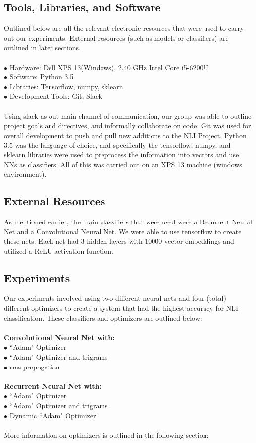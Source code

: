 \documentclass[12pt]{article}
\newcommand\tab[1][1cm]{\hspace*{#1}}
\begin{document}
 \subsection{Tools, Libraries, and Software}
 Outlined below are all the relevant electronic resources that were used to carry out our experiments. External resources (such as models or classifiers) are outlined in later sections.\\
 \\
 $\bullet$ Hardware: Dell XPS 13(Windows), 2.40 GHz Intel Core i5-6200U\\
$\bullet$ Software: Python 3.5\\
$\bullet$ Libraries: Tensorflow, numpy, sklearn\\
$\bullet$ Development Tools: Git, Slack\\
\\
Using slack as out main channel of communication, our group was able to outline project goals and directives, and informally collaborate on code. Git was used for overall development to push and pull new additions to the NLI Project. Python 3.5 was the language of choice, and specifically the tensorflow, numpy, and sklearn libraries were used to preprocess the information into vectors and use NNs as classifiers. All of this was carried out on an XPS 13 machine (windows environment).
\subsection{External Resources}
\tab As mentioned earlier, the main classifiers that were used were a Recurrent Neural Net and a Convolutional Neural Net. We were able to use tensorflow to create these nets. Each net had 3 hidden layers with 10000 vector embeddings and utilized a ReLU activation function.
\subsection{Experiments}
\tab Our experiments involved using two different neural nets and four (total) different optimizers to create a system that had the highest accuracy for NLI classification. These classifiers and optimizers are outlined below:\\
\\
\textbf{Convolutional Neural Net with:}\\
\tab $\bullet$ ``Adam" Optimizer\\
\tab $\bullet$ ``Adam" Optimizer and trigrams\\
\tab $\bullet$ rms propogation\\
\\
\textbf{Recurrent Neural Net with:}\\
\tab $\bullet$ ``Adam" Optimizer\\
\tab $\bullet$ ``Adam" Optimizer and trigrams\\
\tab $\bullet$ Dynamic ``Adam" Optimizer\\
\\
More information on optimizers is outlined in the following section:
\end{document}

